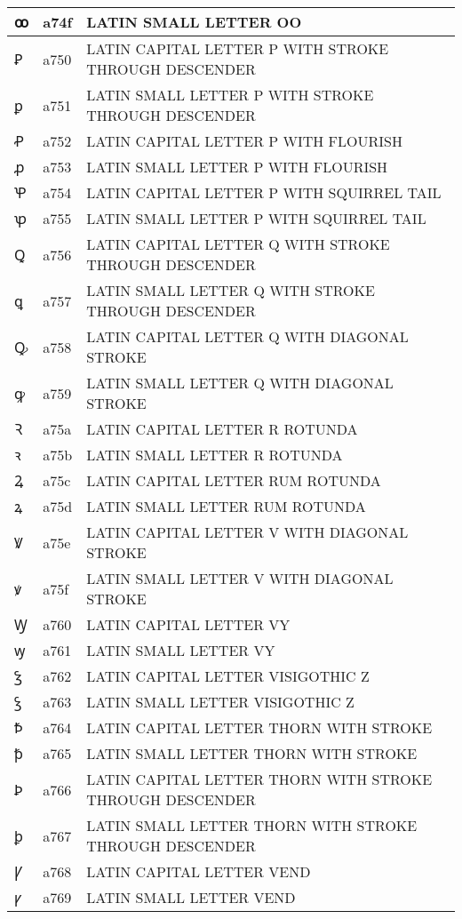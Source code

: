 \documentclass[12pt,letterpaper,openany]{book}
\begin{document}
\begin{center}
\begin{supertabular}{|m{0.25in}|m{0.5in}|m{4in}|}
ꝏ & a74f & LATIN SMALL LETTER OO\\\hline
Ꝑ & a750 & LATIN CAPITAL LETTER P WITH STROKE THROUGH DESCENDER\\\hline
ꝑ & a751 & LATIN SMALL LETTER P WITH STROKE THROUGH DESCENDER\\\hline
Ꝓ & a752 & LATIN CAPITAL LETTER P WITH FLOURISH\\\hline
ꝓ & a753 & LATIN SMALL LETTER P WITH FLOURISH\\\hline
Ꝕ & a754 & LATIN CAPITAL LETTER P WITH SQUIRREL TAIL\\\hline
ꝕ & a755 & LATIN SMALL LETTER P WITH SQUIRREL TAIL\\\hline
Ꝗ & a756 & LATIN CAPITAL LETTER Q WITH STROKE THROUGH DESCENDER\\\hline
ꝗ & a757 & LATIN SMALL LETTER Q WITH STROKE THROUGH DESCENDER\\\hline
Ꝙ & a758 & LATIN CAPITAL LETTER Q WITH DIAGONAL STROKE\\\hline
ꝙ & a759 & LATIN SMALL LETTER Q WITH DIAGONAL STROKE\\\hline
Ꝛ & a75a & LATIN CAPITAL LETTER R ROTUNDA\\\hline
ꝛ & a75b & LATIN SMALL LETTER R ROTUNDA\\\hline
Ꝝ & a75c & LATIN CAPITAL LETTER RUM ROTUNDA\\\hline
ꝝ & a75d & LATIN SMALL LETTER RUM ROTUNDA\\\hline
Ꝟ & a75e & LATIN CAPITAL LETTER V WITH DIAGONAL STROKE\\\hline
ꝟ & a75f & LATIN SMALL LETTER V WITH DIAGONAL STROKE\\\hline
Ꝡ & a760 & LATIN CAPITAL LETTER VY\\\hline
ꝡ & a761 & LATIN SMALL LETTER VY\\\hline
Ꝣ & a762 & LATIN CAPITAL LETTER VISIGOTHIC Z\\\hline
ꝣ & a763 & LATIN SMALL LETTER VISIGOTHIC Z\\\hline
Ꝥ & a764 & LATIN CAPITAL LETTER THORN WITH STROKE\\\hline
ꝥ & a765 & LATIN SMALL LETTER THORN WITH STROKE\\\hline
Ꝧ & a766 & LATIN CAPITAL LETTER THORN WITH STROKE THROUGH DESCENDER\\\hline
ꝧ & a767 & LATIN SMALL LETTER THORN WITH STROKE THROUGH DESCENDER\\\hline
Ꝩ & a768 & LATIN CAPITAL LETTER VEND\\\hline
ꝩ & a769 & LATIN SMALL LETTER VEND\\\hline

\end{supertabular}
\end{center}
\end{document}
